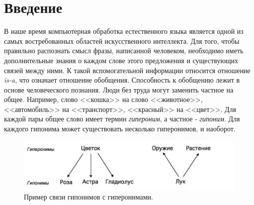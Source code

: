 \section*{Введение}
\label{sec:Introduction} 
\large 

В наше время компьютерная обработка естественного языка является одной из самых
востребованных областей искусственного интеллекта. Для того, чтобы правильно
распознать смысл фразы, написанной человеком, необходимо иметь дополнительные
знания о каждом слове этого предложения и существующих связей между ними. К такой
вспомогательной информации относится отношение \textit{is-a}, что означает отношение
обобщения.
Способность к обобщению лежит в основе человеческого познания. Люди без труда могут
заменить частное на общее. Например, слово <<кошка>> на слово <<животное>>,
<<автомобиль>> на <<транспорт>>, <<красный>> на <<цвет>>. Для каждой пары общее слово имеет
термин \textit{гипероним}, а частное - \textit{гипоним}. Для каждого гипонима может существовать
несколько гиперонимов, и наоборот.


\begin{figure}[ht]
\centering 
    \includegraphics[scale=0.6]{image/Example.png}
    \caption{Пример связи гипонимов с гиперонимами.}
    \label{srg}
\end{figure}



